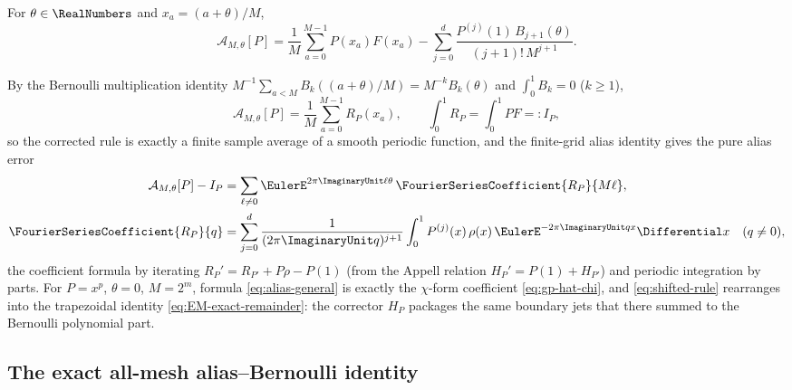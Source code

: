 \begin{definition}
\label{def:shifted-rule}
For $\theta\in\RealNumbers$ and $x_a=(a+\theta)/M$,
\begin{equation}
 \mathcal A_{M,\theta}[P]
 =\frac1M\sum_{a=0}^{M-1}P(x_a)F(x_a)
 -\sum_{j=0}^{d}
 \frac{P^{(j)}(1)\,B_{j+1}(\theta)}{(j+1)!\,M^{j+1}}.
 \label{eq:shifted-rule}
\end{equation}
\end{definition}

By the Bernoulli multiplication identity
$M^{-1}\sum_{a<M}B_k((a+\theta)/M)=M^{-k}B_k(\theta)$ and
$\int_0^1B_k=0$ ($k\ge1$),
\begin{equation}
 \mathcal A_{M,\theta}[P]=\frac1M\sum_{a=0}^{M-1}R_P(x_a),
 \qquad
 \int_0^1R_P=\int_0^1PF=:I_P,
 \label{eq:periodized-average}
\end{equation}
so the corrected rule is exactly a finite sample average of a smooth
periodic function, and the finite-grid alias identity gives the pure
alias error
\begin{align}
 \mathcal A_{M,\theta}[P]-I_P
 &=\sum_{\ell\ne0}\EulerE^{2\pi\ImaginaryUnit\ell\theta}\,
 \FourierSeriesCoefficient{R_P}{M\ell},
 \notag\\
 \FourierSeriesCoefficient{R_P}{q}
 &=\sum_{j=0}^{d}\frac{1}{(2\pi\ImaginaryUnit q)^{j+1}}
 \int_0^1P^{(j)}(x)\,\rho(x)\,\EulerE^{-2\pi\ImaginaryUnit qx}\Differential x
 \quad(q\ne0),
 \label{eq:alias-general}
\end{align}
the coefficient formula by iterating $R_P'=R_{P'}+P\rho-P(1)$ (from the
Appell relation $H_P'=P(1)+H_{P'}$) and periodic integration by parts.
For $P=x^{p}$, $\theta=0$, $M=2^{m}$, formula \eqref{eq:alias-general}
is exactly the $\chi$-form coefficient
\eqref{eq:gp-hat-chi}, and \eqref{eq:shifted-rule} rearranges into the
trapezoidal identity \eqref{eq:EM-exact-remainder}: the corrector
$H_P$ packages the same boundary jets that there summed to the
Bernoulli polynomial part.

\subsection{The exact all-mesh alias--Bernoulli identity}

